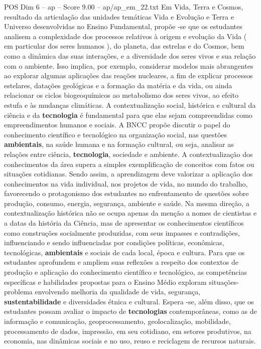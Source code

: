 \begin{textsample}{POS Dim 6 – ap – Score 9.00 – ap/ap\_em\_22.txt}
Em Vida, Terra e Cosmos, resultado da articulação das unidades temáticas Vida e Evolução e Terra e Universo desenvolvidas no Ensino Fundamental, propõe -se que os estudantes analisem a complexidade dos processos relativos à origem e evolução da Vida ( em particular dos seres humanos ), do planeta, das estrelas e do Cosmos, bem como a dinâmica das suas interações, e a diversidade dos seres vivos e sua relação com o ambiente.
Isso implica, por exemplo, considerar modelos mais abrangentes ao explorar algumas aplicações das reações nucleares, a fim de explicar processos estelares, datações geológicas e a formação da matéria e da vida, ou ainda relacionar os ciclos biogeoquímicos ao metabolismo dos seres vivos, ao efeito estufa e às mudanças climáticas.
A contextualização social, histórica e cultural da ciência e da \textbf{tecnologia} é fundamental para que elas sejam compreendidas como empreendimentos humanos e sociais.
A BNCC propõe discutir o papel do conhecimento científico e tecnológico na organização social, nas questões \textbf{ambientais}, na saúde humana e na formação cultural, ou seja, analisar as relações entre ciência, \textbf{tecnologia}, sociedade e ambiente.
A contextualização dos conhecimentos da área supera a simples exemplificação de conceitos com fatos ou situações cotidianas.
Sendo assim, a aprendizagem deve valorizar a aplicação dos conhecimentos na vida individual, nos projetos de vida, no mundo do trabalho, favorecendo o protagonismo dos estudantes no enfrentamento de questões sobre produção, consumo, energia, segurança, ambiente e saúde.
Na mesma direção, a contextualização histórica não se ocupa apenas da menção a nomes de cientistas e a datas da história da Ciência, mas de apresentar os conhecimentos científicos como construções socialmente produzidas, com seus impasses e contradições, influenciando e sendo influenciadas por condições políticas, econômicas, tecnológicas, \textbf{ambientais} e sociais de cada local, época e cultura.
Para que os estudantes aprofundem e ampliem suas reflexões a respeito dos contextos de produção e aplicação do conhecimento científico e tecnológico, as competências específicas e habilidades propostas para o Ensino Médio exploram situações-problema envolvendo melhoria da qualidade de vida, segurança, \textbf{sustentabilidade} e diversidades étnica e cultural.
Espera -se, além disso, que os estudantes possam avaliar o impacto de \textbf{tecnologias} contemporâneas, como as de informação e comunicação, geoprocessamento, geolocalização, mobilidade, processamento de dados, impressão, em seu cotidiano, em setores produtivos, na economia, nas dinâmicas sociais e no uso, reuso e reciclagem de recursos naturais.

\end{textsample}
